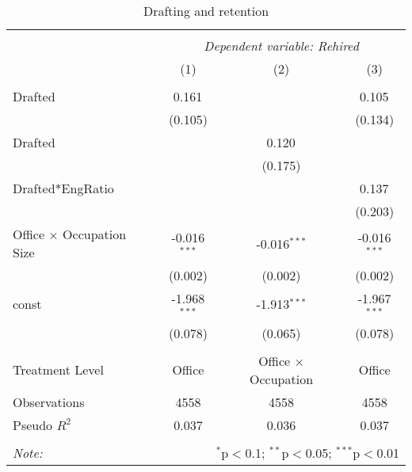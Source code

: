 \begin{table}[!htbp] \centering
\caption{Drafting and retention}
\begin{tabular}{@{\extracolsep{5pt}}lccc}
\\[-1.8ex]\hline
\hline \\[-1.8ex]
& \multicolumn{3}{c}{\textit{Dependent variable: Rehired}} \
\cr \cline{2-4}
\\[-1.8ex] & (1) & (2) & (3) \\
\hline \\[-1.8ex]
 Drafted & 0.161$^{}$ & & 0.105$^{}$ \\
& (0.105) & & (0.134) \\
 Drafted & & 0.120$^{}$ & \\
& & (0.175) & \\
 Drafted*EngRatio & & & 0.137$^{}$ \\
& & & (0.203) \\
 Office $\times$ Occupation Size & -0.016$^{***}$ & -0.016$^{***}$ & -0.016$^{***}$ \\
& (0.002) & (0.002) & (0.002) \\
 const & -1.968$^{***}$ & -1.913$^{***}$ & -1.967$^{***}$ \\
& (0.078) & (0.065) & (0.078) \\
\hline \\[-1.8ex]
 Treatment Level & Office & Office $\times$ Occupation & Office\\
 Observations & 4558 & 4558 & 4558 \\
 Pseudo $R^2$ & 0.037 & 0.036 & 0.037 \\
\hline
\hline \\[-1.8ex]
\textit{Note:} & \multicolumn{3}{r}{$^{*}$p$<$0.1; $^{**}$p$<$0.05; $^{***}$p$<$0.01} \\
\end{tabular}
\end{table}